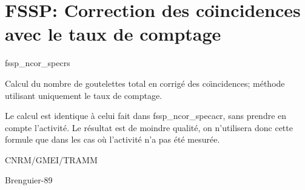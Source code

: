 %
\section{FSSP: Correction des co\"{\i}ncidences avec le
taux de comptage}

 {\sf fssp\_ncor\_specrs}

Calcul du nombre de goutelettes total en corrig\'e des co\"{\i}ncidences; m\'ethode
utilisant uniquement le taux de comptage.

\bigskip





Le calcul est identique \`a celui fait dans \textsf{fssp\_ncor\_specacr},
sans prendre en compte l'activit\'e. Le r\'esultat est de moindre
qualit\'e, on n'utilisera donc cette formule que dans les cas o\`u
l'activit\'e n'a pas \'et\'e mesur\'ee.

CNRM/GMEI/TRAMM

Brenguier-89\cite{Brenguier-89}
